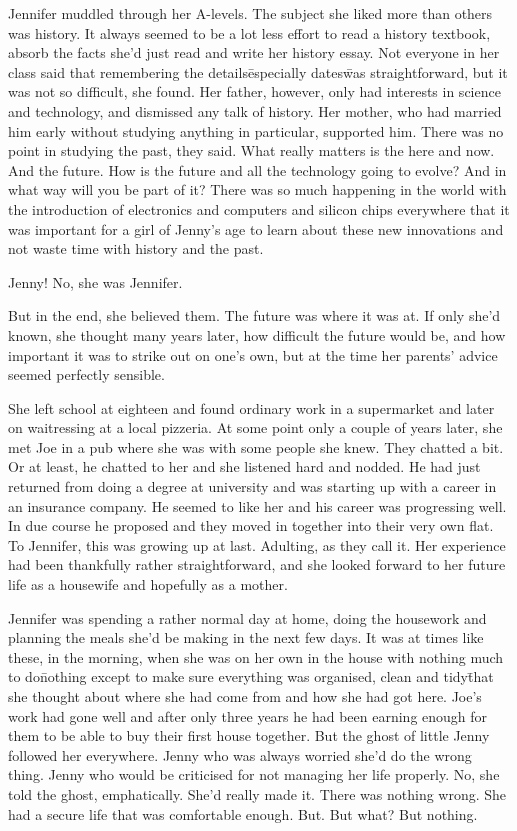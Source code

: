 Jennifer muddled through her A-levels. The subject she liked more 
than others was history. It always seemed to be a lot less 
effort to read a history textbook, absorb the facts she'd just read 
and write her history essay. Not everyone in her class said that 
remembering the details\=especially dates\=was straightforward, but 
it was not so difficult, she found. Her father, however, only had 
interests in science and technology, and dismissed any talk of 
history. Her mother, who had married him early without studying 
anything in particular, supported him. There was no point in 
studying the past, they said. What really matters is the here and 
now. And the future. How is the future and all the technology 
going to evolve? And in what way will you be part of it? There was 
so much happening in the world with the introduction of electronics 
and computers and silicon chips everywhere that it was important 
for a girl of Jenny's age to learn about these new innovations and 
not waste time with history and the past.

Jenny! No, she was Jennifer.

But in the end, she believed them. The future was where it was at. 
If only she'd known, she thought many years later, how difficult 
the future would be, and how important it was to strike out on 
one's own, but at the time her parents' advice seemed perfectly 
sensible.

She left school at eighteen and found ordinary work in a 
supermarket and later on waitressing at a local pizzeria. At some 
point only a couple of years later, she met Joe in a pub where she 
was with some people she knew. They chatted a bit. Or at least, he 
chatted to her and she listened hard and nodded. He had just 
returned from doing a degree at university and was starting up with 
a career in an insurance company. He seemed to like her and his 
career was progressing well. In due course he proposed and 
they moved in together into their very own flat. To Jennifer, this 
was growing up at last. Adulting, as they call it. Her experience 
had been thankfully rather straightforward, and she looked forward 
to her future life as a housewife and hopefully as a mother.

\fugue

Jennifer was spending a rather normal day at home, doing the 
housework and planning the meals she'd be making in the next few 
days. It was at times like these, in the morning, when she was on 
her own in the house with nothing much to do\=nothing except to 
make sure everything was organised, clean and tidy\=that she 
thought about where she had come from and how she had got here. 
Joe's work had gone well and after only three years he had been 
earning enough for them to be able to buy their first house 
together. But the ghost of little Jenny followed her everywhere. 
Jenny who was always worried she'd do the wrong thing. Jenny who 
would be criticised for not managing her life properly. No, 
she told the ghost, emphatically. She'd really made it. There was nothing 
wrong. She had a secure life that was comfortable enough. But. But 
what? But nothing.

